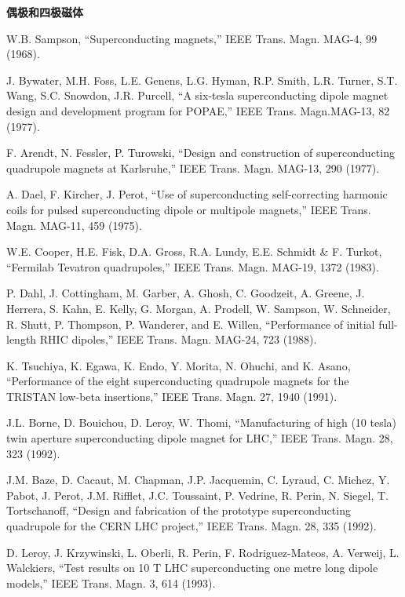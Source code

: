 \noindent \textbf{偶极和四极磁体}

\noindent [9.302] W.B. Sampson, ``Superconducting magnets,” IEEE Trans. Magn. MAG-4, 99 (1968).

\noindent [9.303] J. Bywater, M.H. Foss, L.E. Genens, L.G. Hyman, R.P. Smith, L.R. Turner,
S.T. Wang, S.C. Snowdon, J.R. Purcell, ``A six-tesla superconducting dipole magnet
design and development program for POPAE,” IEEE Trans. Magn.MAG-13,
82 (1977).

\noindent [9.304] F. Arendt, N. Fessler, P. Turowski, ``Design and construction of superconducting
quadrupole magnets at Karlsruhe,” IEEE Trans. Magn. MAG-13, 290 (1977).

\noindent [9.305] A. Dael, F. Kircher, J. Perot, ``Use of superconducting self-correcting harmonic
coils for pulsed superconducting dipole or multipole magnets,” IEEE Trans. Magn.
MAG-11, 459 (1975).

\noindent [9.306] W.E. Cooper, H.E. Fisk, D.A. Gross, R.A. Lundy, E.E. Schmidt \& F. Turkot,
``Fermilab Tevatron quadrupoles,” IEEE Trans. Magn. MAG-19, 1372 (1983).

\noindent [9.307] P. Dahl, J. Cottingham, M. Garber, A. Ghosh, C. Goodzeit, A. Greene, J. Herrera,
S. Kahn, E. Kelly, G. Morgan, A. Prodell, W. Sampson, W. Schneider, R. Shutt,
P. Thompson, P. Wanderer, and E. Willen, ``Performance of initial full-length
RHIC dipoles,” IEEE Trans. Magn. MAG-24, 723 (1988).

\noindent [9.308] K. Tsuchiya, K. Egawa, K. Endo, Y. Morita, N. Ohuchi, and K. Asano, ``Performance
of the eight superconducting quadrupole magnets for the TRISTAN
low-beta insertions,” IEEE Trans. Magn. 27, 1940 (1991).

\noindent [9.309] J.L. Borne, D. Bouichou, D. Leroy, W. Thomi, ``Manufacturing of high (10 tesla)
twin aperture superconducting dipole magnet for LHC,” IEEE Trans. Magn. 28,
323 (1992).

\noindent [9.310] J.M. Baze, D. Cacaut, M. Chapman, J.P. Jacquemin, C. Lyraud, C. Michez, Y.
Pabot, J. Perot, J.M. Rifflet, J.C. Toussaint, P. Vedrine, R. Perin, N. Siegel, T.
Tortschanoff, ``Design and fabrication of the prototype superconducting quadrupole
for the CERN LHC project,” IEEE Trans. Magn. 28, 335 (1992).

\noindent [9.311] D. Leroy, J. Krzywinski, L. Oberli, R. Perin, F. Rodriguez-Mateos, A. Verweij,
L. Walckiers, ``Test results on 10 T LHC superconducting one metre long dipole
models,” IEEE Trans. Magn. 3, 614 (1993).

